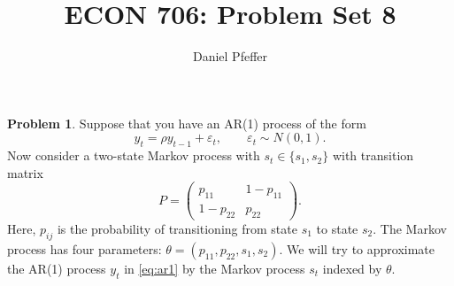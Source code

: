 \documentclass[oneside,reqno]{amsart}
\title{ECON 706: Problem Set 8}
\author{Daniel Pfeffer}
\newcommand{\eps}{\varepsilon}
\theoremstyle{definition}
\newtheorem{prob}{Problem}
\begin{document}
\maketitle

\begin{prob}
Suppose that you have an AR(1) process of the form 
\begin{equation}\label{eq:ar1}
	y_t = \rho y_{t-1} + \eps_t,
	\qquad \eps_t \sim N(0,1).
\end{equation}
Now consider a two-state Markov process with $s_t \in \{s_1, s_2\}$ with transition matrix
\begin{equation}\label{eq:P}
	P = \begin{pmatrix}
		p_{11} & 1-p_{11} \\
		1- p_{22} & p_{22}
	\end{pmatrix}.
\end{equation}
Here, $p_{ij}$ is the probability of transitioning from state $s_1$ to state $s_2$. The Markov process has four parameters: $\theta = (p_{11}, p_{22}, s_1, s_2)$. We will try to approximate the AR(1) process $y_t$ in \eqref{eq:ar1} by the Markov process $s_t$ indexed by $\theta$.
\end{prob}
\end{document}
